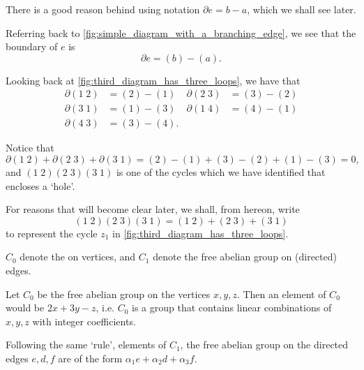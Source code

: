 \documentclass[notoc,notitlepage]{tufte-book}
\begin{document}
\begin{remark}
  There is a good reason behind using notation $\partial e = b - a$, which we
  shall see later.
\end{remark}

\begin{eg}
  Referring back to \cref{fig:simple_diagram_with_a_branching_edge}, we see that
  the boundary of $e$ is
  \begin{equation*}
    \partial e = (b) - (a).
  \end{equation*}
\end{eg}

\begin{eg}\label{eg:identifying_actual_cycles}
  Looking back at \cref{fig:third_diagram_has_three_loops}, we have that
  \begin{align*}
    \partial (1 \; 2) &= (2) - (1) & \partial (2 \; 3) &= (3) - (2) \\
    \partial (3 \; 1) &= (1) - (3) & \partial (1 \; 4) &= (4) - (1) \\
    \partial (4 \; 3) &= (3) - (4).
  \end{align*}

  Notice that
  \begin{equation*}
    \partial(1 \; 2) + \partial(2 \; 3) + \partial(3 \; 1)
    = (2) - (1) + (3) - (2) + (1) - (3) = 0,
  \end{equation*}
  and $(1 \; 2)(2 \; 3)(3 \; 1)$ is one of the cycles which we have identified
  that encloses a `hole'.
\end{eg}

For reasons that will become clear later, we shall, from hereon, write
\begin{equation*}
  (1 \; 2)(2 \; 3)(3 \; 1) = (1 \; 2) + (2 \; 3) + (3 \; 1)
\end{equation*}
to represent the cycle $z_1$ in \cref{fig:third_diagram_has_three_loops}.

 $C_0$ denote the  on vertices, and $C_1$ denote the free abelian
group on (directed) edges.

\begin{eg}
  Let $C_0$ be the free abelian group on the vertices $x, y, z$. Then an element
  of $C_0$ would be $2x + 3y - z$, i.e. $C_0$ is a group that contains linear
  combinations of $x, y, z$ with integer coefficients.

  Following the same `rule', elements of $C_1$, the free abelian group on the
  directed edges $e, d, f$ are of the form $\alpha_1 e + \alpha_2 d + \alpha_3
  f$.
\end{eg}
\end{document}
